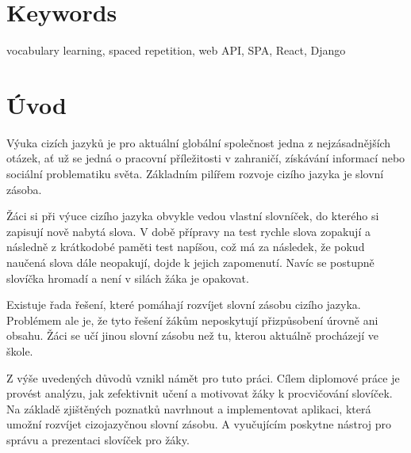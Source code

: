 \documentclass[a4paper,11pt,titlepage,fleqn]{article}
\begin{document}

\section*{Keywords}
vocabulary learning, spaced repetition, web API, SPA, React, Django

\thispagestyle{empty}

\newpage
\thispagestyle{empty}
\setcounter{tocdepth}{2}
\tableofcontents


\newpage
\thispagestyle{empty}
\listoffigures
\listoftables
\renewcommand{\lstlistingname}{Ukázka kódu}
\renewcommand{\lstlistlistingname}{Seznam ukázek zdrojových kódů}
\lstlistoflistings

\newpage
\thispagestyle{empty}
\printglossary[title=Seznam zkratek]
\cleardoublepage

\section{Úvod}
    Výuka cizích jazyků je pro aktuální globální společnost jedna z nejzásadnějších otázek, ať už se jedná o pracovní příležitosti v zahraničí, získávání informací nebo sociální problematiku světa. Základním pilířem rozvoje cizího jazyka je slovní zásoba.

    Žáci si při výuce cizího jazyka obvykle vedou vlastní slovníček, do kterého si zapisují nově nabytá slova. V době přípravy na test rychle slova zopakují a následně z krátkodobé paměti test napíšou, což má za následek, že pokud naučená slova dále neopakují, dojde k jejich zapomenutí. Navíc se postupně slovíčka hromadí a není v silách žáka je opakovat. 

    Existuje řada řešení, které pomáhají rozvíjet slovní zásobu cizího jazyka. Problémem ale je, že tyto řešení žákům neposkytují přizpůsobení úrovně ani obsahu. Žáci se učí jinou slovní zásobu než tu, kterou aktuálně procházejí ve škole. 

    Z výše uvedených důvodů vznikl námět pro tuto práci. Cílem diplomové práce je provést analýzu, jak zefektivnit učení a motivovat žáky k procvičování slovíček. Na základě zjištěných poznatků navrhnout a implementovat aplikaci, která umožní rozvíjet cizojazyčnou slovní zásobu. A vyučujícím poskytne nástroj pro správu a prezentaci slovíček pro žáky. 
\end{document}
